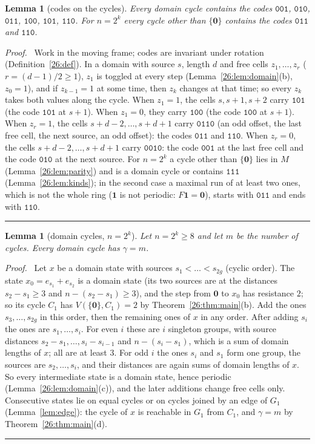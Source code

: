 \documentclass[10pt,a4paper]{article}
\newtheorem{lemma}[theorem]{Lemma}
\newcommand{\qedmark}{\rule{1.1ex}{1.1ex}}
\newenvironment{proof}[1][Proof]{\par\smallskip\noindent\textit{#1.}\ }{\hfill\qedmark\par\smallskip}
\newcommand{\zero}{\mathbf{0}}                %
\newcommand{\one}{\mathbf{1}}                 %
\newcommand{\Gone}{G_1}                       %
\newcommand{\code}[1]{\mathtt{#1}}            %
\begin{document}
\begin{lemma}[codes on the cycles]\label{26:lem:codes}
Every domain cycle contains the codes $\code{001}$, $\code{010}$, $\code{011}$, $\code{100}$, $\code{101}$,
$\code{110}$. For $n=2^k$ every cycle other than $\{\zero\}$ contains the codes $\code{011}$ and $\code{110}$.
\end{lemma}
\begin{proof}
Work in the moving frame; codes are invariant under rotation (Definition~\ref{26:def}). In a domain with source
$s$, length $d$ and free cells $z_1,\dots,z_r$ ($r=(d-1)/2\ge1$), $z_1$ is toggled at every step
(Lemma~\ref{26:lem:domain}(b), $z_0=1$), and if $z_{k-1}=1$ at some time, then $z_k$ changes at that time; so every
$z_k$ takes both values along the cycle. When $z_1=1$, the cells $s,s+1,s+2$ carry $\code{101}$ (the code
$\code{101}$ at $s+1$). When $z_1=0$, they carry $\code{100}$ (the code $\code{100}$ at $s+1$). When $z_r=1$, the
cells $s+d-2,\dots,s+d+1$ carry $\code{0110}$ (an odd offset, the last free cell, the next source, an odd offset):
the codes $\code{011}$ and $\code{110}$. When $z_r=0$, the cells $s+d-2,\dots,s+d+1$ carry $\code{0010}$: the code
$\code{001}$ at the last free cell and the code $\code{010}$ at the next source.
For $n=2^k$ a cycle other than $\{\zero\}$ lies in $M$ (Lemma~\ref{26:lem:parity}) and is a domain cycle or contains
$\code{111}$ (Lemma~\ref{26:lem:kinds}); in the second case a maximal run of at least two ones, which is not the
whole ring ($\one$ is not periodic: $F\one=\zero$), starts with $\code{011}$ and ends with $\code{110}$.
\end{proof}

\begin{lemma}[domain cycles, $n=2^k$]\label{26:lem:domaingamma}
Let $n=2^k\ge8$ and let $m$ be the number of cycles. Every domain cycle has $\gamma=m$.
\end{lemma}
\begin{proof}
Let $x$ be a domain state with sources $s_1<\dots<s_{2g}$ (cyclic order). The state $x_0=e_{s_1}+e_{s_2}$ is a
domain state (its two sources are at the distances $s_2-s_1\ge3$ and $n-(s_2-s_1)\ge3$), and the step from $\zero$
to $x_0$ has resistance $2$; so its cycle $C_1$ has $V(\{\zero\},C_1)=2$ by Theorem~\ref{26:thm:main}(b). Add the
ones $s_3,\dots,s_{2g}$ in this order, then the remaining ones of $x$ in any order. After adding $s_i$ the ones are
$s_1,\dots,s_i$. For even $i$ these are $i$ singleton groups, with source distances
$s_2-s_1,\dots,s_i-s_{i-1}$ and $n-(s_i-s_1)$, which is a sum of domain lengths of $x$; all are at least $3$. For
odd $i$ the ones $s_i$ and $s_1$ form one group, the sources are $s_2,\dots,s_i$, and their distances are again
sums of domain lengths of $x$. So every intermediate state is a domain state, hence periodic
(Lemma~\ref{26:lem:domain}(c)), and the later additions change free cells only. Consecutive states lie on equal
cycles or on cycles joined by an edge of $\Gone$ (Lemma~\ref{lem:edge}): the cycle of $x$ is reachable in $\Gone$
from $C_1$, and $\gamma=m$ by Theorem~\ref{26:thm:main}(d).
\end{proof}
\end{document}
